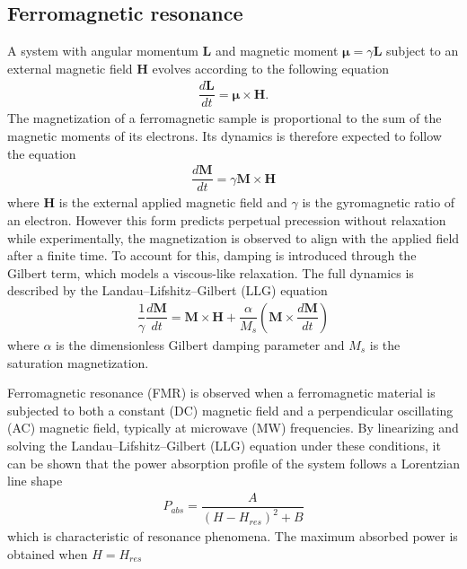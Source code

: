 \documentclass[12pt,a4paper,oneside,openany]{book}
\begin{document}
\subsection{Ferromagnetic resonance}
A system with angular momentum $\mathbf{L}$ and magnetic moment $\boldsymbol{\mu} = \gamma \mathbf{L}$ subject to an external magnetic field $\mathbf{H}$ evolves according to the following equation
\begin{align}
	\dfrac{d \mathbf{L}}{dt} = \boldsymbol{\mu} \times \mathbf{H}.
\end{align}
The magnetization of a ferromagnetic sample is proportional to the sum of the magnetic moments of its electrons. Its dynamics is therefore expected to follow the equation
\begin{align}
	\dfrac{d \mathbf{M}}{dt} = \gamma \mathbf{M} \times \mathbf{H}
\end{align}
where $\mathbf{H}$ is the external applied magnetic field and $\gamma$ is the gyromagnetic ratio of an electron. However this form predicts perpetual precession without relaxation while experimentally, the magnetization is observed to align with the applied field after a finite time. To account for this, damping is introduced through the Gilbert term, which models a viscous-like relaxation. The full dynamics is described by the Landau–Lifshitz–Gilbert (LLG) equation
\begin{align}
	\dfrac{1}{\gamma}\dfrac{d \mathbf{M}}{dt} = \mathbf{M} \times \mathbf{H} + \dfrac{\alpha}{M_s} \left( \mathbf{M} \times \dfrac{d \mathbf{M}}{dt} \right)
	\label{eq:Landau_Lifshitz_Gilbert}
\end{align}
where $\alpha$ is the dimensionless Gilbert damping parameter and $M_s$ is the saturation magnetization.

Ferromagnetic resonance (FMR) is observed when a ferromagnetic material is subjected to both a constant (DC) magnetic field and a perpendicular oscillating (AC) magnetic field, typically at microwave (MW) frequencies. By linearizing and solving the Landau–Lifshitz–Gilbert (LLG) equation under these conditions, it can be shown that the power absorption profile of the system follows a Lorentzian line shape
\begin{align*}
	P_{abs} = \dfrac{A}{(H-H_{res})^2 + B}
\end{align*}
which is characteristic of resonance phenomena. The maximum absorbed power is obtained when $H=H_{res}$
\end{document}
